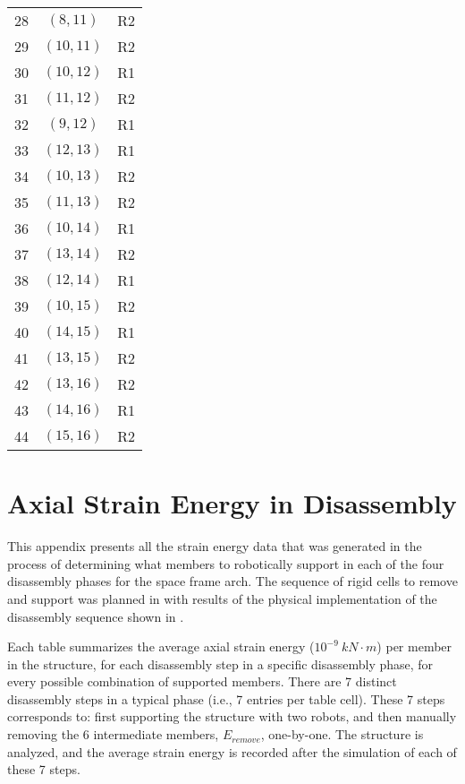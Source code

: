 \begin{table}[H]
\begin{tabular}{*{3}{c}}
        28&$(8,11)$&R2\\
        29&$(10,11)$&R2\\
        \cmidrule{1-3}
        30&$(10,12)$&R1\\
        31&$(11,12)$&R2\\
        32&$(9,12)$&R1\\
        \cmidrule{1-3}
        33&$(12,13)$&R1\\
        34&$(10,13)$&R2\\
        35&$(11,13)$&R2\\
        \cmidrule{1-3}
        36&$(10,14)$&R1\\
        37&$(13,14)$&R2\\
        38&$(12,14)$&R1\\
        \cmidrule{1-3}
        39&$(10,15)$&R2\\
        40&$(14,15)$&R1\\
        41&$(13,15)$&R2\\
        \cmidrule{1-3}
        42&$(13,16)$&R2\\
        43&$(14,16)$&R1\\
        44&$(15,16)$&R2\\
    \end{tabular}
    \label{table:appendix_sequence}
\end{table}


\newpage
\section{Axial Strain Energy in Disassembly} \label{sec:appendixA_space}
    This appendix presents all the strain energy data that was generated in the process of determining what members to robotically support in each of the four disassembly phases for the space frame arch. The sequence of rigid cells to remove and support was planned in  with results of the physical implementation of the disassembly sequence shown in .
    
    Each table summarizes the average axial strain energy ($10^{-9} \ kN\cdot m$) per member in the structure, for each disassembly step in a specific disassembly phase, for every possible combination of supported members. There are 7 distinct disassembly steps in a typical phase (i.e., 7 entries per table cell). These 7 steps corresponds to: first supporting the structure with two robots, and then manually removing the 6 intermediate members, $E_{remove}$, one-by-one. The structure is analyzed, and the average strain energy is recorded after the simulation of each of these 7 steps.
    
